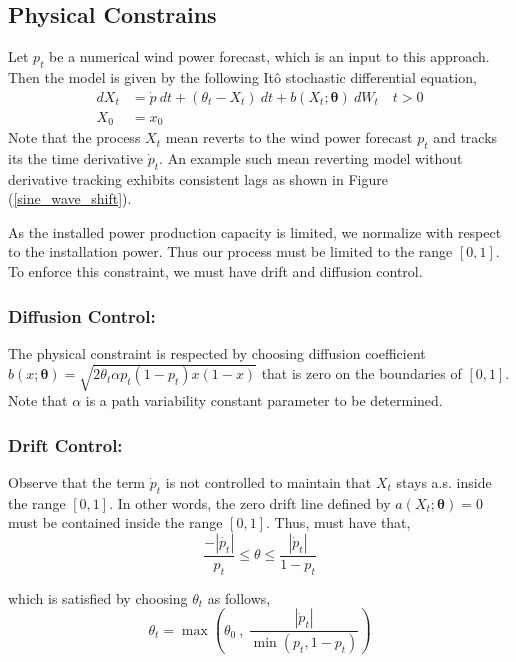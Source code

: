 \documentclass[10pt,twocolumn,letterpaper]{article}
\begin{document}
\subsection{Physical Constrains}

Let $p_t$ be a numerical wind power forecast, which is an input to this approach. Then the model is given by the following It\^{o} stochastic differential equation,
\begin{equation}
\begin{split}
dX_t&= \dot{p} \ dt + (\theta_t -X_t) \ dt + b (X_t; \bm{\theta} ) \ dW_t \quad t > 0 \\
X_0&=x_0
\end{split}
\end{equation}
Note that the process $X_t$ mean reverts to  the wind power forecast $p_t$ and  tracks its the time derivative $\dot{p}_t$.  An example such mean reverting model without derivative tracking exhibits consistent lags as shown in Figure (\ref{sine_wave_shift}).

As the  installed power production capacity is limited, we normalize with respect to the installation power. Thus our process must be limited to the range $[0,1]$. To enforce this constraint, we must have drift and diffusion control.
\subsubsection*{Diffusion Control: } The physical constraint is respected  by choosing  diffusion coefficient $ b (x; \bm{\theta} )= \sqrt{2 \theta_t \alpha p_t(1-p_t) x (1-x)} $ that is zero on the boundaries of $[0,1]$. Note that $\alpha$ is a path variability constant parameter to be determined.
\subsubsection*{Drift Control: }

Observe that the term $\dot{p}_t $ is not controlled to maintain that $X_t$ stays a.s.  inside the range $[0,1]$. In other words, the zero drift line defined by $a(X_t; \bm{\theta}) =0$ must  be contained inside the range $[0,1]$. Thus, must have that,
\begin{equation}
\frac{- |\dot{p_t}|}{p_t} \leq \theta \leq \frac{|\dot{p}_t|}{1- p_t}
\end{equation}

which is satisfied  by choosing $\theta_t$ as follows,
\begin{equation}
\theta_t = \max \left( \theta_0 \ , \ \frac{|\dot{p}_t|}{\min (p_t, 1-p_t)}  \right ) \label{theta_t}
\end{equation}
\end{document}
